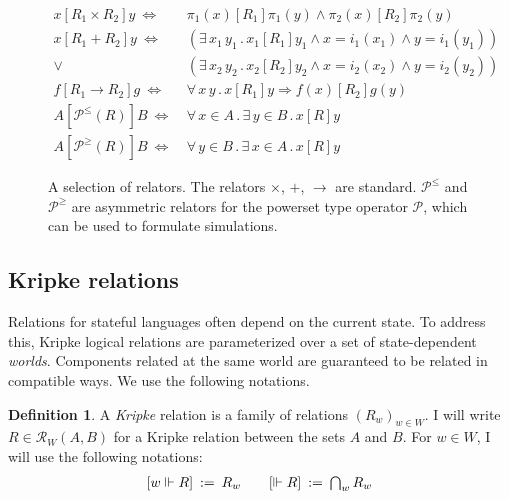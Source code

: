 \documentclass[11pt,oneside]{book}
\theoremstyle{definition}
\newtheorem{definition}[theorem]{Definition}
\newcommand{\ifr}[1]{\mathrel{[{#1}]}}
\newcommand{\figsize}{}
\begin{document}
\begin{figure} %
  \figsize
  \begin{align*}
    x \ifr{R_1 \times R_2} y \ \Leftrightarrow\  &
      \pi_1(x) \ifr{R_1} \pi_1(y) \wedge
      \pi_2(x) \ifr{R_2} \pi_2(y) \\
    x \ifr{R_1 + R_2} y \ \Leftrightarrow\  &
      (\exists \, x_1 \, y_1 \,.\,
        x_1 \ifr{R_1} y_1 \wedge
        x = i_1(x_1) \wedge
        y = i_1(y_1)) \\ \vee\ &
      (\exists \, x_2 \, y_2 \,.\,
        x_2 \ifr{R_2} y_2 \wedge
        x = i_2(x_2) \wedge
        y = i_2(y_2)) \\
    f \ifr{R_1 \rightarrow R_2} g \ \Leftrightarrow\  &
      \forall \, x \, y \,.\,
        x \ifr{R_1} y \Rightarrow
        f(x) \ifr{R_2} g(y) \\
    A \ifr{\mathcal{P}^\le(R)} B \ \Leftrightarrow\  &
      \forall \, x \in A \,.\,
      \exists \, y \in B \,.\,
      x \ifr{R} y \\
    A \ifr{\mathcal{P}^\ge(R)} B \ \Leftrightarrow\  &
      \forall \, y \in B \,.\,
      \exists \, x \in A \,.\,
      x \ifr{R} y
  \end{align*}
  \caption[A selection of relators]%
   {A selection of relators.
    The relators $\times$, $+$, $\rightarrow$ are standard.
    $\mathcal{P}^\le$ and $\mathcal{P}^\ge$ are asymmetric
    relators for the powerset type operator $\mathcal{P}$,
    which can be used to formulate simulations.
    }
  \label{fig:relators}
\end{figure}


\subsection{Kripke relations} \label{sec:klr} %

Relations for stateful languages
often depend on the current state.
To address this,
Kripke logical relations
are parameterized over a set of state-dependent \emph{worlds}.
Components related at the same world
are guaranteed to be related in compatible ways.
We use the following notations.

\begin{definition} \label{def:klr} %
A \emph{Kripke} relation is
a family of relations $(R_w)_{w \in W}$.
I will write $R \in \mathcal{R}_W(A, B)$
for a Kripke relation between the sets $A$ and $B$.
For $w \in W$, I will use the following notations:
\[
\begin{array}{c@{\qquad}c}
    [w \Vdash R] \: := \: R_w &
    [\Vdash R] \: := \: \bigcap_{w} R_w
\end{array}
\]
\end{definition}
\end{document}
